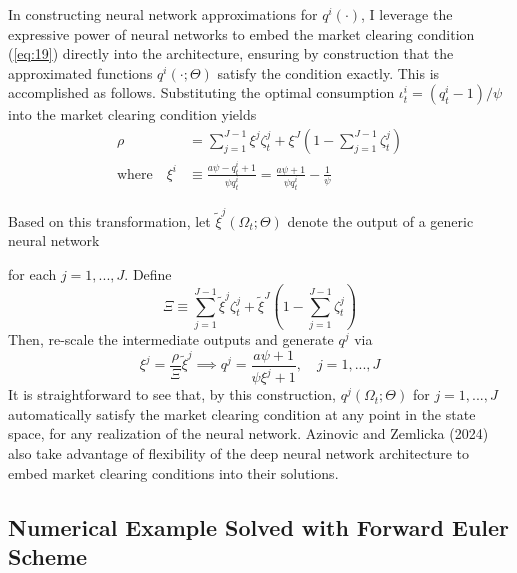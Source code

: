 \documentclass{article}
\begin{document}
In constructing neural network approximations for $q^{i}(\cdot)$, I leverage the expressive power of neural networks to embed the market clearing condition (\ref{eq:19}) directly into the architecture, ensuring by construction that the approximated functions $q^{i}(\cdot;\Theta)$ satisfy the condition exactly. This is accomplished as follows. Substituting the optimal consumption $\iota_{t}^{i}=(q_{t}^{i}-1)/\psi$ into the market clearing condition yields
\begin{align*}
\rho&=\sum_{j=1}^{J-1}\xi^{j}\zeta_{t}^{j}+\xi^{J}(1-\sum_{j=1}^{J-1}\zeta_{t}^{j}) \\
\text{where} \quad \xi^{i}&\equiv\frac{a\psi-q_{t}^{i}+1}{\psi q_{t}^{i}}=\frac{a\psi+1}{\psi q_{t}^{i}}-\frac{1}{\psi}
\end{align*}

Based on this transformation, let $\tilde{\xi}^{j}(\Omega_{t};\Theta)$ denote the output of a generic neural network

\clearpage

for each $j=1,...,J$. Define
\[
\Xi\equiv\sum_{j=1}^{J-1}\tilde{\xi}^{j}\zeta_{t}^{j}+\tilde{\xi}^{J}(1-\sum_{j=1}^{J-1}\zeta_{t}^{j})
\]
Then, re-scale the intermediate outputs and generate $q^{j}$ via
\[
\xi^{j}=\frac{\rho}{\Xi}\tilde{\xi}^{j} \implies q^{j}=\frac{a\psi+1}{\psi\xi^{j}+1}, \quad j=1,...,J
\]
It is straightforward to see that, by this construction, $q^{j}(\Omega_{t};\Theta)$ for $j=1,...,J$ automatically satisfy the market clearing condition at any point in the state space, for any realization of the neural network. Azinovic and Zemlicka (2024) also take advantage of flexibility of the deep neural network architecture to embed market clearing conditions into their solutions.

\subsection{Numerical Example Solved with Forward Euler Scheme}
\end{document}
